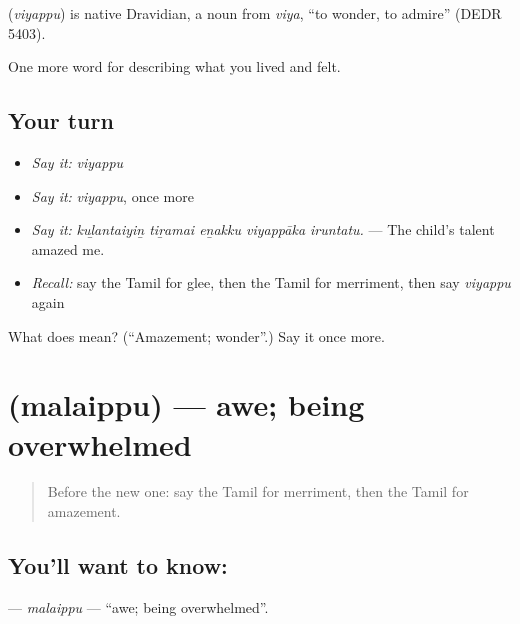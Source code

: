 \begin{cousinweb}
\textbf{} (\emph{viyappu}) is native Dravidian, a noun from  \emph{viya}, \textquotedblleft{}to wonder, to admire\textquotedblright{} (DEDR 5403).
\end{cousinweb}

\begin{grammarlens}[title={What you've built}]
One more word for describing what you lived and felt.
\end{grammarlens}

\subsection*{Your turn}
\begin{itemize}
\raggedright
  \item \emph{Say it:} \emph{viyappu}
  \item \emph{Say it:} \emph{viyappu}, once more
  \item \emph{Say it:} \emph{kuḻantaiyiṉ tiṟamai eṉakku viyappāka iruntatu.} — The child’s talent amazed me.
  \item \emph{Recall:} say the Tamil for glee, then the Tamil for merriment, then say \emph{viyappu} again
\end{itemize}

\begin{tcolorbox}[breakable,colback=teal!4,colframe=teal!35!black,title={Before you move on}]
What does  mean? (\textquotedblleft{}Amazement; wonder\textquotedblright{}.) Say it once more.
\end{tcolorbox}
\section[\texorpdfstring{\ta{மலைப்பு} (malaippu)}{மலைப்பு (malaippu)}]{ (malaippu) — awe; being overwhelmed}

\label{lesson:TA-C460-malaippu}



\begin{quote}
Before the new one: say the Tamil for merriment, then the Tamil for amazement.
\end{quote}

\subsection*{You'll want to know: }
\textbf{} — \emph{malaippu} — \textquotedblleft{}awe; being overwhelmed\textquotedblright{}.

